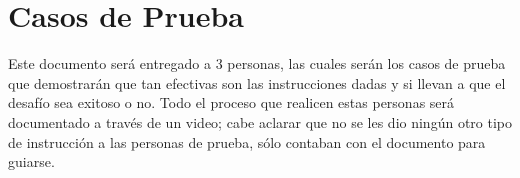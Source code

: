 \documentclass{article}
\begin{document}
\section{Casos de Prueba} \label{Pruebas}
Este documento será entregado a 3 personas, las cuales serán los casos de prueba que demostrarán que tan efectivas son las instrucciones dadas y si llevan a que el desafío sea exitoso o no. Todo el proceso que realicen estas personas será documentado a través de un video; cabe aclarar que no se les dio ningún otro tipo de instrucción a las personas de prueba, sólo contaban con el documento para guiarse.
\end{document}
